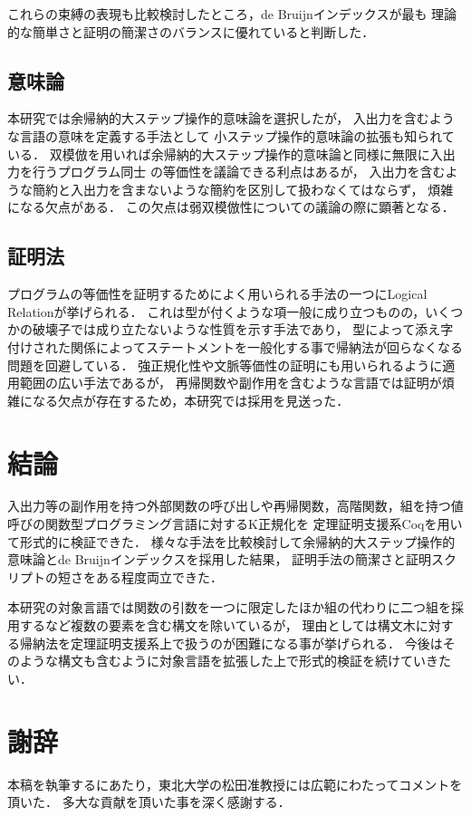 \documentclass[T]{compsoft}
\begin{document}
これらの束縛の表現も比較検討したところ，de Bruijnインデックスが最も
理論的な簡単さと証明の簡潔さのバランスに優れていると判断した．

\subsection{意味論}
本研究では余帰納的大ステップ操作的意味論を選択したが，
入出力を含むような言語の意味を定義する手法として
小ステップ操作的意味論の拡張も知られている．
双模倣を用いれば余帰納的大ステップ操作的意味論と同様に無限に入出力を行うプログラム同士
の等価性を議論できる利点はあるが，
入出力を含むような簡約と入出力を含まないような簡約を区別して扱わなくてはならず，
煩雑になる欠点がある．
この欠点は弱双模倣性についての議論の際に顕著となる．

\subsection{証明法}
プログラムの等価性を証明するためによく用いられる手法の一つにLogical Relation\cite{Pierce:2004:ATT:1076265}が挙げられる．
これは型が付くような項一般に成り立つものの，いくつかの破壊子では成り立たないような性質を示す手法であり，
型によって添え字付けされた関係によってステートメントを一般化する事で帰納法が回らなくなる問題を回避している．
強正規化性や文脈等価性の証明にも用いられるように適用範囲の広い手法であるが，
再帰関数や副作用を含むような言語では証明が煩雑になる欠点が存在するため，本研究では採用を見送った．

\section{結論}
入出力等の副作用を持つ外部関数の呼び出しや再帰関数，高階関数，組を持つ値呼びの関数型プログラミング言語に対するK正規化を
定理証明支援系Coqを用いて形式的に検証できた．
様々な手法を比較検討して余帰納的大ステップ操作的意味論とde Bruijnインデックスを採用した結果，
証明手法の簡潔さと証明スクリプトの短さをある程度両立できた．

本研究の対象言語では関数の引数を一つに限定したほか組の代わりに二つ組を採用するなど複数の要素を含む構文を除いているが，
理由としては構文木に対する帰納法を定理証明支援系上で扱うのが困難になる事が挙げられる．
今後はそのような構文も含むように対象言語を拡張した上で形式的検証を続けていきたい．

\section*{謝辞}

本稿を執筆するにあたり，東北大学の松田准教授には広範にわたってコメントを頂いた．
多大な貢献を頂いた事を深く感謝する．



\end{document}
